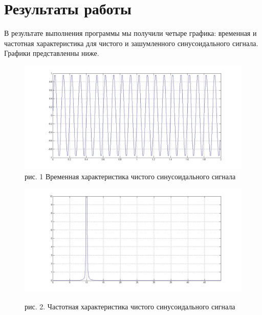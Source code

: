 \documentclass[10pt,a4paper]{report}
\begin{document}
\section{Результаты работы}
В результате выполнения программы мы получили четыре графика: временная и частотная характеристика для чистого и зашумленного синусоидального сигнала. Графики представленны ниже. \newpage
\begin{figure}
\begin{center}
\includegraphics[width=150mm, scale = 0.3]{sint.jpg}
рис. 1 Временная характеристика чистого синусоидального сигнала
\end{center}
\begin{center}
\includegraphics[width=150mm, scale = 0.3]{sinch.jpg}
\end{center}
рис. 2. Частотная характеристика чистого синусоидального сигнала
\end{figure}
\end{document}
